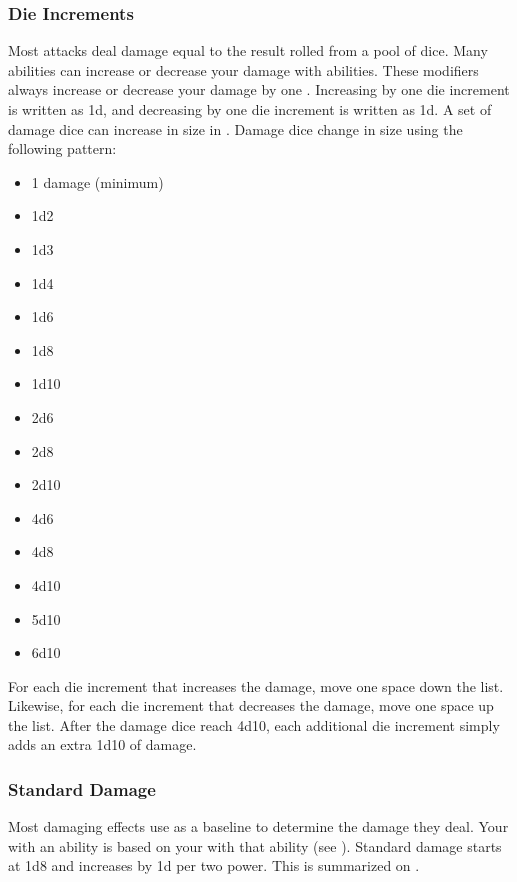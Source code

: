         \subsubsection{Die Increments}\label{Die Increments}
            Most attacks deal damage equal to the result rolled from a pool of dice.
            Many abilities can increase or decrease your damage with abilities.
            These modifiers always increase or decrease your damage by one .
            Increasing by one die increment is written as \plus1d, and decreasing by one die increment is written as \minus1d.
            A set of damage dice can increase in size in .
            Damage dice change in size using the following pattern:
            \begin{itemize}
                \item 1 damage (minimum)
                \item 1d2
                \item 1d3
                \item 1d4
                \item 1d6
                \item 1d8
                \item 1d10
                \item 2d6
                \item 2d8
                \item 2d10
                \item 4d6
                \item 4d8
                \item 4d10
                \item 5d10
                \item 6d10
            \end{itemize}

            For each die increment that increases the damage, move one space down the list.
            Likewise, for each die increment that decreases the damage, move one space up the list.
            After the damage dice reach 4d10, each additional die increment simply adds an extra 1d10 of damage.

        \subsubsection{Standard Damage}\label{Standard Damage}
            Most damaging effects use  as a baseline to determine the damage they deal.
            Your  with an ability is based on your  with that ability (see ).
            Standard damage starts at 1d8 and increases by \plus1d per two power.
            This is summarized on .


